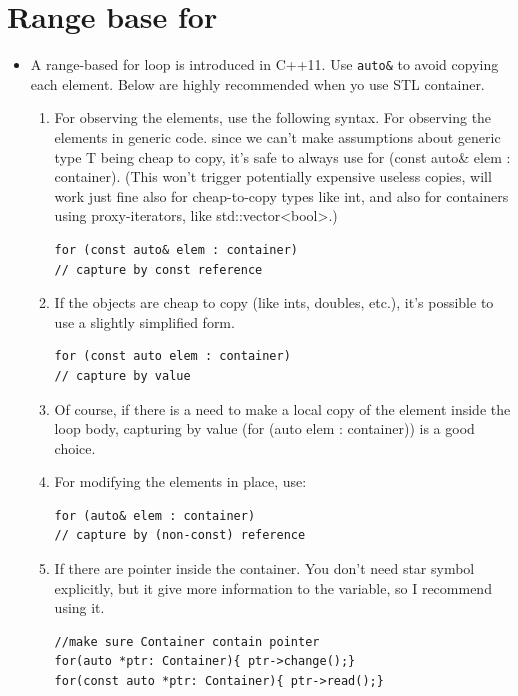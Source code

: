 \documentclass[a4paper,11pt,twoside]{book}
\begin{document}
\section{Range base for}
\begin{itemize}
	
	\item A range-based for loop is introduced in C++11. Use \texttt{auto\&} to avoid copying each element. Below are highly recommended when yo use STL container.
	
	\begin{enumerate}
		\item For observing the elements, use the following syntax. For observing the elements in generic code. since we can't make assumptions about generic type T being cheap to copy, it's safe to always use for (const auto\& elem : container).
		(This won't trigger potentially expensive useless copies, will work just fine also for cheap-to-copy types like int, and also for containers using proxy-iterators, like std::vector<bool>.)
\begin{lstlisting}[numbers=none]
for (const auto& elem : container)    
// capture by const reference
\end{lstlisting}	
		
		
		\item If the objects are cheap to copy (like ints, doubles, etc.), it's possible to use a slightly simplified form. 
		
\begin{lstlisting}[numbers=none]
for (const auto elem : container)   
// capture by value
\end{lstlisting}            
		
		\item Of course, if there is a need to make a local copy of the element inside the loop body, capturing by value (for (auto elem : container)) is a good choice.
		
		\item For modifying the elements in place, use:
\begin{lstlisting}[numbers=none]
for (auto& elem : container)    
// capture by (non-const) reference
\end{lstlisting}
		
		\item If there are pointer inside the container. You don't need star symbol explicitly, but it give more information to the variable, so I recommend using it.
\begin{lstlisting}[numbers=none]
//make sure Container contain pointer
for(auto *ptr: Container){ ptr->change();}
for(const auto *ptr: Container){ ptr->read();}
\end{lstlisting}
		

\end{enumerate}
\end{itemize}
\end{document}
